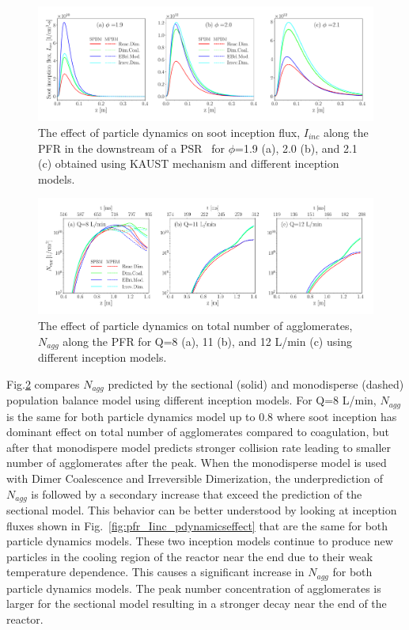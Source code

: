 \begin{figure}[H]
	\centering
	\includegraphics[width=1\textwidth]{Figures/Results/PSR/I_inc_eq_ratio_pdynamiceffect.pdf}
	\caption{The effect of particle dynamics on soot inception flux, $I_{inc}$ along the PFR in the downstream of a PSR~\citep{manzello2007soot} for $\phi$=1.9 (a), 2.0 (b), and 2.1 (c) obtained using KAUST mechanism and different inception models.}
	\label{fig:psr_I_inc_pdynamicseffect} 
\end{figure}


\begin{figure}[H]
	\centering
	\includegraphics[width=1\textwidth]{Figures/Results/PFR/N_agg_pdynamiceffect.pdf}
	\caption{The effect of particle dynamics on total number of agglomerates, $N_{agg}$ along the PFR for Q=8 (a), 11 (b), and 12 L/min (c) using different inception models.}
	\label{fig:pfr_Nagg_pdynamicseffect} 
\end{figure}

Fig.\ref{fig:pfr_Nagg_pdynamicseffect} compares $N_{agg}$ predicted by the sectional (solid) and monodisperse (dashed) population balance model using different inception models. For Q=8 L/min, $N_{agg}$ is the same for both particle dynamics model up to 0.8 where soot inception has dominant effect on total number of agglomerates compared to coagulation, but after that monodispere model predicts stronger collision rate leading to smaller number of agglomerates after the peak. When the monodisperse model is used with Dimer Coalescence and Irreversible Dimerization, the underprediction of $N_{agg}$ is followed by a secondary increase that exceed the prediction of the sectional model. This behavior can be better understood by looking at inception fluxes shown in Fig.~\ref{fig:pfr_Iinc_pdynamicseffect} that are the same for both particle dynamics models. These two inception models continue to produce new particles in the cooling region of the reactor near the end due to their weak temperature dependence. This causes a significant increase in $N_{agg}$ for both particle dynamics models. The peak number concentration of agglomerates is larger for the sectional model resulting in a stronger decay near the end of the reactor.


